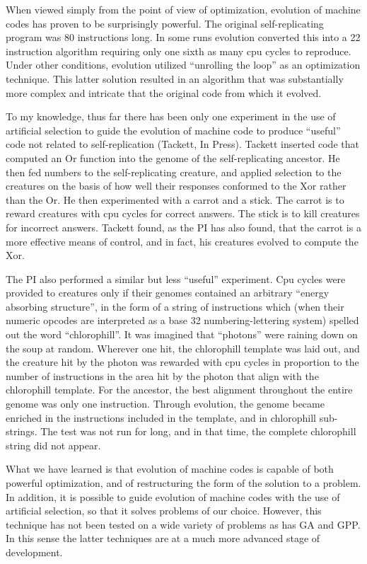 When viewed simply from the point of view of optimization, evolution of
machine codes has proven to be surprisingly powerful.  The original
self-replicating program was 80 instructions long.  In some runs evolution
converted this into a 22 instruction algorithm requiring only one sixth as
many cpu cycles to reproduce.  Under other conditions, evolution utilized
``unrolling the loop'' as an optimization technique.  This latter solution
resulted in an algorithm that was substantially more complex and intricate
that the original code from which it evolved.

To my knowledge, thus far there has been only one experiment in the use
of artificial selection to guide the evolution of machine code to produce
``useful'' code not related to self-replication (Tackett, In Press).
Tackett inserted code that computed an Or function into the genome of the
self-replicating ancestor.  He then fed numbers to the self-replicating
creature, and applied selection to the creatures on the basis of how well
their responses conformed to the Xor rather than the Or.  He then experimented
with a carrot and a stick.  The carrot is to reward creatures with cpu cycles
for correct answers.  The stick is to kill creatures for incorrect answers.
Tackett found, as the PI has also found, that the carrot is a more effective
means of control, and in fact, his creatures evolved to compute the Xor.

The PI also performed a similar but less ``useful'' experiment.  Cpu cycles
were provided to creatures only if their genomes contained an arbitrary
``energy absorbing structure'', in the form of a string of instructions which
(when their numeric opcodes are interpreted as a base 32 numbering-lettering
system) spelled out the word ``chlorophill''.  It was imagined that ``photons''
were raining down on the soup at random.  Wherever one hit, the chlorophill
template was laid out, and the creature hit by the photon was rewarded with
cpu cycles in proportion to the number of instructions in the area hit by the
photon that align with the chlorophill template.  For the ancestor, the best
alignment throughout the entire genome was only one instruction.  Through
evolution, the genome became enriched in the instructions included in the
template, and in chlorophill sub-strings.  The test was not run for long,
and in that time, the complete chlorophill string did not appear.

What we have learned is that evolution of machine codes is capable of both
powerful optimization, and of restructuring the form of the solution to a
problem.  In addition, it is possible to guide evolution of machine codes
with the use of artificial selection, so that it solves problems of our
choice.  However, this technique has not been tested on a wide variety of
problems as has GA and GPP.  In this sense the latter techniques are at
a much more advanced stage of development.

